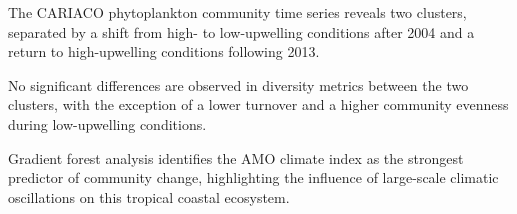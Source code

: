\documentclass[draft]{agujournal2019}
\begin{document}






\begin{keypoints}
\item The CARIACO phytoplankton community time series reveals two clusters, separated by a shift from high- to low-upwelling conditions after 2004 and a return to high-upwelling conditions following 2013.
\item No significant differences are observed in diversity metrics between the two clusters, with the exception of a lower turnover and a higher community evenness during low-upwelling conditions.
\item Gradient forest analysis identifies the AMO climate index as the strongest predictor of community change, highlighting the influence of large-scale climatic oscillations on this tropical coastal ecosystem.
\end{keypoints}

%
%

%
%
\end{document}

